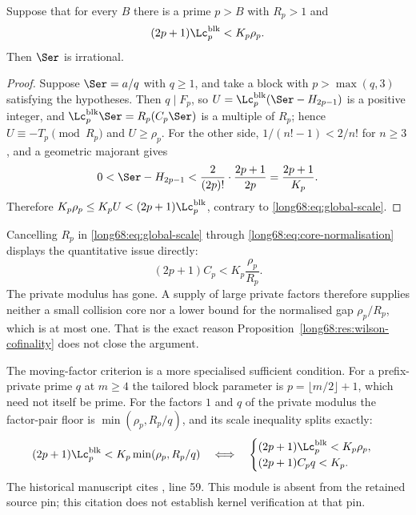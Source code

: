 \begin{theorem}\label{long68:res:global-residue}
Suppose that for every $B$ there is a prime $p>B$ with $R_p>1$ and
\begin{equation}\label{long68:eq:global-scale}
 (2p+1)\Lc^{\mathrm{blk}}_p<K_p\rho_p .
\end{equation}
Then $\Ser$ is irrational.
\end{theorem}

\begin{proof}
Suppose $\Ser=a/q$ with $q\ge1$, and take a block with $p>\max(q,3)$
satisfying the hypotheses.  Then $q\mid F_p$, so
$U=\Lc^{\mathrm{blk}}_p(\Ser-H_{2p-1})$ is a positive integer, and
$\Lc^{\mathrm{blk}}_p\Ser=R_p(C_p\Ser)$ is a multiple of $R_p$; hence
$U\equiv-T_p\pmod{R_p}$ and $U\ge\rho_p$.  For the other side,
$1/(n!-1)<2/n!$ for $n\ge3$, and a geometric majorant gives
\[
 0<\Ser-H_{2p-1}<\frac{2}{(2p)!}\cdot\frac{2p+1}{2p}=\frac{2p+1}{K_p}.
\]
Therefore $K_p\rho_p\le K_pU<(2p+1)\Lc^{\mathrm{blk}}_p$, contrary to
\eqref{long68:eq:global-scale}.
\end{proof}

Cancelling $R_p$ in \eqref{long68:eq:global-scale} through
\eqref{long68:eq:core-normalisation} displays the quantitative issue directly:
\begin{equation}\label{long68:eq:core-gap-scale}
 (2p+1)C_p<K_p\frac{\rho_p}{R_p}.
\end{equation}
The private modulus has gone.  A supply of large private factors therefore
supplies neither a small collision core nor a lower bound for the normalised
gap $\rho_p/R_p$, which is at most one.  That is the exact reason
Proposition~\ref{long68:res:wilson-cofinality} does not close the argument.

\label{long68:res:lead-moving-factor-split}
\label{long68:res:moving-factor-scale-split}
The moving-factor criterion is a more specialised sufficient condition.  For
a prefix-private prime $q$ at $m\ge4$ the tailored block parameter is
$p=\lfloor m/2\rfloor+1$, which need not itself be prime.  For the factors
$1$ and $q$ of the private modulus the factor-pair floor is
$\min(\rho_p,R_p/q)$, and its scale inequality splits exactly:
\begin{equation}\label{long68:eq:factor-split}
 (2p+1)\Lc^{\mathrm{blk}}_p<K_p\min(\rho_p,R_p/q)
 \quad\Longleftrightarrow\quad
 \begin{cases}
 (2p+1)\Lc^{\mathrm{blk}}_p<K_p\rho_p,\\
 (2p+1)C_pq<K_p .
 \end{cases}
\end{equation}
  The historical manuscript cites , line 59. This module is absent from the retained source pin; this citation does not establish kernel verification at that pin.

